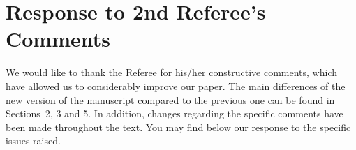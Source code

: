 \clearpage
\section*{Response to 2nd Referee's Comments}
We would like to thank the Referee for his/her constructive comments, which have allowed us to considerably improve our paper. The main differences of the new version of the manuscript compared to the previous one can be found in Sections~2, 3 and 5. In addition, changes regarding the specific comments have been made throughout the text.
You may find below our response to the specific issues raised.


